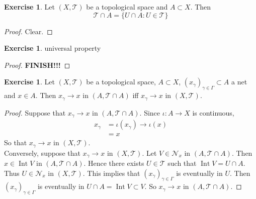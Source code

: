 \documentclass[12pt]{amsart}
\theoremstyle{definition}
\newtheorem{ex}[definition]{Exercise}
\newcommand{\gam}{\gamma}
\newcommand{\Gam}{\Gamma}
\newcommand{\MN}{\mathcal{N}}
\newcommand{\MT}{\mathcal{T}}
\newcommand{\tbf}[1]{\textbf{#1}}
\DeclareMathOperator{\Int}{Int}
\DeclareMathOperator*{\0}{\mbf{0}}
\DeclareMathOperator*{\1}{\mbf{1}}
\begin{document}
\begin{ex}
	Let $(X, \MT)$ be a topological space and $A \subset X$. Then $$\MT \cap A = \{U \cap A: U \in \MT\}$$
\end{ex}

\begin{proof}
	Clear.
\end{proof}

\begin{ex}
	universal property
\end{ex}

\begin{proof}
	\tbf{FINISH!!!}
\end{proof}

\begin{ex}
	Let $(X, \MT)$ be a topological space, $A \subset X$, $(x_{\gam})_{\gam \in \Gam} \subset A$ a net and $x \in A$. Then $x_{\gam} \rightarrow x$ in $(A,\MT \cap A)$ iff $x_{\gam} \rightarrow x$ in $(X,\MT)$.
\end{ex}

\begin{proof}
	Suppose that $x_{\gam} \rightarrow x$ in $(A,\MT \cap A)$. Since $\iota: A \rightarrow X$ is continuous, 
	\begin{align*}
		x_{\gam} 
		&= \iota(x_{\gam}) \rightarrow \iota(x) \\
		&= x
	\end{align*}
	So that $x_{\gam} \rightarrow x$ in $(X,\MT)$. \\
	Conversely, suppose that $x_{\gam} \rightarrow x$ in $(X,\MT)$. Let $V \in \MN_{x}$ in $(A, \MT \cap A)$. Then $x \in \Int V$ in  $(A, \MT \cap A)$. Hence there exists $U \in \MT$ such that $\Int V = U \cap A$. Thus $U \in \MN_x$ in $(X, \MT)$. This implies that $(x_{\gam})_{\gam \in \Gam}$ is eventually in $U$. Then $(x_{\gam})_{\gam \in \Gam}$ is eventually in $U \cap A = \Int V \subset V$. So $x_{\gam} \rightarrow x$ in $(A, \MT \cap A)$.  
\end{proof}
















	
	
	
	
	
	
	
	
	
	
\end{document}
